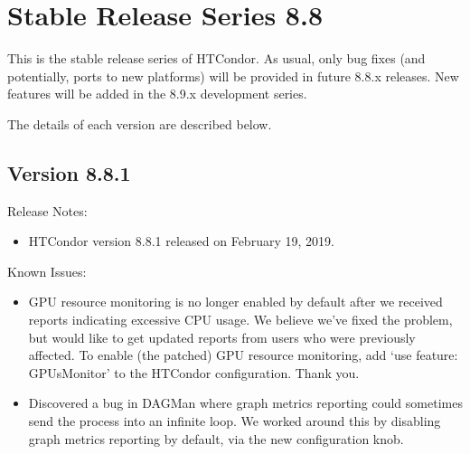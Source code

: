 
\section{Stable Release Series 8.8}\label{sec:History-8-8}

This is the stable release series of HTCondor.
As usual, only bug fixes (and potentially, ports to new platforms)
will be provided in future 8.8.x releases.
New features will be added in the 8.9.x development series.

The details of each version are described below.

\subsection*{\label{sec:New-8-8-1}Version 8.8.1}

\noindent Release Notes:

\begin{itemize}

\item HTCondor version 8.8.1 released on February 19, 2019.

\end{itemize}

\noindent Known Issues:

\begin{itemize}

\item GPU resource monitoring is no longer enabled by default after we
received reports indicating excessive CPU usage.  We believe we've fixed
the problem, but would like to get updated reports from users who were
previously affected.  To enable (the patched) GPU resource monitoring,
add `use feature: GPUsMonitor' to the HTCondor configuration.  Thank you.


\item Discovered a bug in DAGMan where graph metrics reporting could sometimes 
send the  process into an infinite loop. We worked around this 
by disabling graph metrics reporting by default, via the new  
 configuration knob.

\end{itemize}


